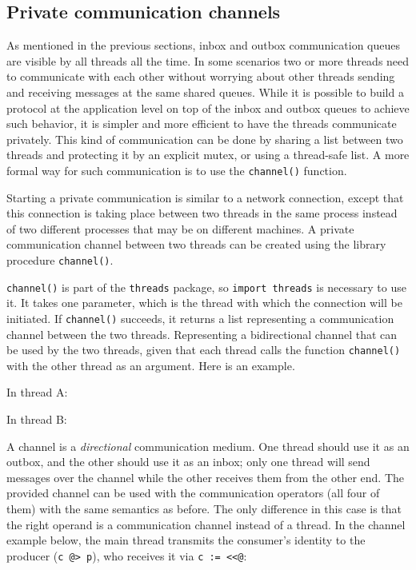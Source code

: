 \subsection{Private communication channels}

As mentioned in the previous sections, inbox and outbox communication queues are
visible by all threads all the time. In some scenarios two or more threads need
to communicate with each other without worrying about other threads sending and
receiving messages at the same shared queues. While it is possible to build a
protocol at the application level on top of the inbox and outbox queues to
achieve such behavior, it is simpler and more efficient to have the threads
communicate privately. This kind of communication can be done by sharing a list
between two threads and protecting it by an explicit mutex, or using a
thread-safe list. A more formal way for such communication is to use the
\texttt{channel()} function.

Starting a private communication is similar to a network connection, except that
this connection is taking place between two threads in the same process instead
of two different processes that may be on different machines. A private
communication channel between two threads can be created using the library
procedure \texttt{channel()}.

\texttt{channel()} is part of the \texttt{threads} package, so \texttt{import
  threads} is necessary to use it.  It takes one parameter, which is the thread
with which the connection will be initiated.  If \texttt{channel()} succeeds, it
returns a list representing a communication channel between the two
threads. Representing a bidirectional channel that can be used by the two
threads, given that each thread calls the function \texttt{channel()} with the
other thread as an argument.  Here is an example.

In thread A:


In thread B:


A channel is a \emph{directional} communication medium.  One thread should use
it as an outbox, and the other should use it as an inbox; only one thread will
send messages over the channel while the other receives them from the other
end. The provided channel can be used with the communication operators (all four
of them) with the same semantics as before. The only difference in this case is
that the right operand is a communication channel instead of a thread.  In the
channel example below, the main thread transmits the consumer's identity to the
producer (\texttt{c @> p}), who receives it via \texttt{c := <{}<@}:


